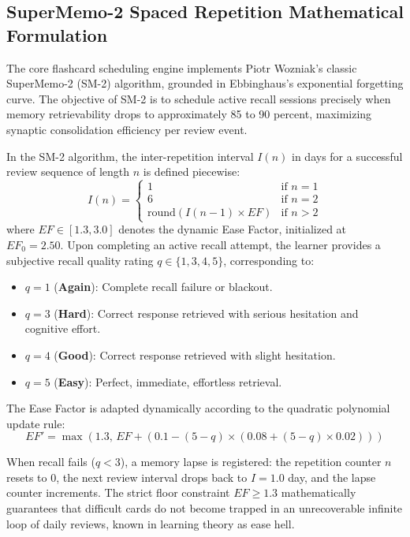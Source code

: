 \documentclass[12pt,a4paper,oneside]{report}
\begin{document}
\subsection{SuperMemo-2 Spaced Repetition Mathematical Formulation}
The core flashcard scheduling engine implements Piotr Wozniak's classic SuperMemo-2 (SM-2) algorithm, grounded in Ebbinghaus's exponential forgetting curve. The objective of SM-2 is to schedule active recall sessions precisely when memory retrievability drops to approximately 85 to 90 percent, maximizing synaptic consolidation efficiency per review event.

In the SM-2 algorithm, the inter-repetition interval $I(n)$ in days for a successful review sequence of length $n$ is defined piecewise:
\begin{equation}
    I(n) = 
    \begin{cases} 
        1 & \text{if } n = 1 \\
        6 & \text{if } n = 2 \\
        \text{round}\left(I(n-1) \times EF\right) & \text{if } n > 2 
    \end{cases}
\end{equation}
where $EF \in [1.3, 3.0]$ denotes the dynamic Ease Factor, initialized at $EF_0 = 2.50$. Upon completing an active recall attempt, the learner provides a subjective recall quality rating $q \in \{1, 3, 4, 5\}$, corresponding to:
\begin{itemize}
    \item $q = 1$ (\textbf{Again}): Complete recall failure or blackout.
    \item $q = 3$ (\textbf{Hard}): Correct response retrieved with serious hesitation and cognitive effort.
    \item $q = 4$ (\textbf{Good}): Correct response retrieved with slight hesitation.
    \item $q = 5$ (\textbf{Easy}): Perfect, immediate, effortless retrieval.
\end{itemize}

The Ease Factor is adapted dynamically according to the quadratic polynomial update rule:
\begin{equation}
    EF' = \max\left(1.3, \, EF + \left(0.1 - (5 - q) \times \left(0.08 + (5 - q) \times 0.02\right)\right)\right)
\end{equation}

When recall fails ($q < 3$), a memory lapse is registered: the repetition counter $n$ resets to 0, the next review interval drops back to $I = 1.0$ day, and the lapse counter increments. The strict floor constraint $EF \ge 1.3$ mathematically guarantees that difficult cards do not become trapped in an unrecoverable infinite loop of daily reviews, known in learning theory as ease hell.
\end{document}
